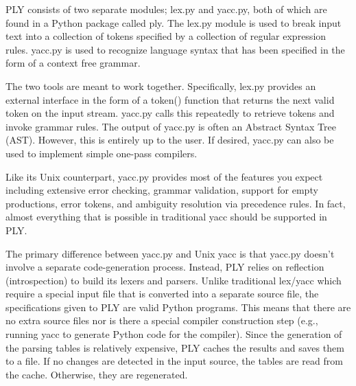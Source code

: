 
PLY consists of two separate modules; lex.py and yacc.py, both of which are
found in a Python package called ply. The lex.py module is used to break input
text into a collection of tokens specified by a collection of regular expression
rules. yacc.py is used to recognize language syntax that has been specified in
the form of a context free grammar.

The two tools are meant to work together. Specifically, lex.py provides an
external interface in the form of a token() function that returns the next valid
token on the input stream. yacc.py calls this repeatedly to retrieve tokens and
invoke grammar rules. The output of yacc.py is often an Abstract Syntax Tree
(AST). However, this is entirely up to the user. If desired, yacc.py can also be
used to implement simple one-pass compilers.

Like its Unix counterpart, yacc.py provides most of the features you expect
including extensive error checking, grammar validation, support for empty
productions, error tokens, and ambiguity resolution via precedence rules. In
fact, almost everything that is possible in traditional yacc should be supported
in PLY.

The primary difference between yacc.py and Unix yacc is that yacc.py doesn't
involve a separate code-generation process. Instead, PLY relies on reflection
(introspection) to build its lexers and parsers. Unlike traditional lex/yacc
which require a special input file that is converted into a separate source
file, the specifications given to PLY are valid Python programs. This means that
there are no extra source files nor is there a special compiler construction
step (e.g., running yacc to generate Python code for the compiler). Since the
generation of the parsing tables is relatively expensive, PLY caches the results
and saves them to a file. If no changes are detected in the input source, the
tables are read from the cache. Otherwise, they are regenerated.

